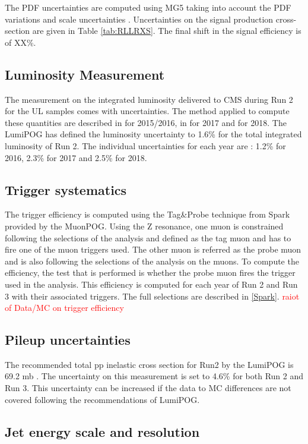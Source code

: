 \documentclass{cernatlasnote}
\begin{document}
        The PDF uncertainties are computed using MG5 taking into account the PDF variations and scale uncertainties \cite{HowToPDF}.
        Uncertainties on the signal production cross-section are given in Table \ref{tab:RLLRXS}. The final shift in the signal efficiency is of XX\%.
    \pagebreak
    \subsection{Luminosity Measurement}
        The measurement on the integrated luminosity delivered to CMS during Run 2 for the UL samples comes with uncertainties. The method applied to compute these quantities are described in \cite{Sirunyan_2021} for 2015/2016, in \cite{CMS:LUM-17-004} for 2017 and \cite{CMS-PAS-LUM-18-002} for 2018. The LumiPOG has defined the luminosity uncertainty to 1.6\% for the total integrated luminosity of Run 2. The individual uncertainties for each year are : 1.2\% for 2016, 2.3\% for 2017 and 2.5\% for 2018.
    \pagebreak
    \subsection{Trigger systematics}
        The trigger efficiency is computed using the Tag\&Probe technique from Spark provided by the MuonPOG. Using the Z resonance, one muon is constrained following the selections of the analysis and defined as the tag muon and has to fire one of the muon triggers used. The other muon is referred as the probe muon and is also following the selections of the analysis on the muons. To compute the efficiency, the test that is performed is whether the probe muon fires the trigger used in the analysis. This efficiency is computed for each year of Run 2 and Run 3 with their associated triggers. The full selections are described in \ref{Spark}. \textcolor{red}{raiot of Data/MC on trigger efficiency}
    \pagebreak
    \subsection{Pileup uncertainties}
        The recommended total pp inelastic cross section for Run2 by the LumiPOG is 69.2 mb \cite{PileupSystematicErrors}. The uncertainty on this measurement is set to 4.6\% for both Run 2 and Run 3. This uncertainty can be increased if the data to MC differences are not covered following the recommendations of LumiPOG.
    \pagebreak
    \subsection{Jet energy scale and resolution}
\end{document}
